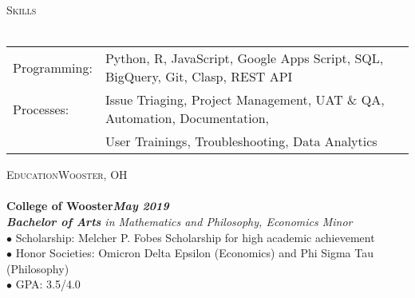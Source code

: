 \documentclass[a4paper]{article}
\newcommand{\lineunder} {
    \vspace*{-8pt} \\
    \hspace*{-18pt} \hrulefill \\
}
\newcommand{\header} [1] {
    {\hspace*{-18pt}\vspace*{6pt} \textsc{#1}}
    \vspace*{-6pt} \lineunder
}
\begin{document}
\header{Skills}
\begin{tabular}[leftmargin=-10pt,align=left]{ l l }
	\hspace*{-16pt}Programming:    &   Python, R, JavaScript, Google Apps Script, SQL, BigQuery, Git, Clasp, REST API\\
    \hspace*{-16pt}Processes:      &   Issue Triaging, Project Management, UAT \& QA, Automation, Documentation,\\ 
                    &   User Trainings, Troubleshooting,  Data Analytics
\end{tabular}
\vspace{2mm}

\header{Education\hfill Wooster, OH}
\hspace{-16pt}\textbf{College of Wooster}\hfill\textbf{\textit{May 2019}}\\
\hspace{-16pt}\textit{\textbf{Bachelor of Arts} in Mathematics and Philosophy, Economics Minor}\\
\hspace*{-12pt}$\bullet$ Scholarship: Melcher P. Fobes Scholarship for high academic achievement\\
\hspace*{-12pt}$\bullet$ Honor Societies: Omicron Delta Epsilon (Economics) and Phi Sigma Tau (Philosophy)\\
\hspace*{-12pt}$\bullet$ GPA: 3.5/4.0
\vspace*{2mm}
\end{document}
